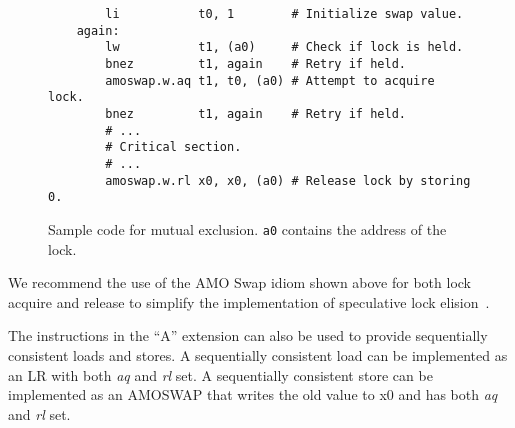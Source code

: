 \begin{figure}[h!]
\begin{center}
\begin{verbatim}
        li           t0, 1        # Initialize swap value.
    again:
        lw           t1, (a0)     # Check if lock is held.
        bnez         t1, again    # Retry if held.
        amoswap.w.aq t1, t0, (a0) # Attempt to acquire lock.
        bnez         t1, again    # Retry if held.
        # ...
        # Critical section.
        # ...
        amoswap.w.rl x0, x0, (a0) # Release lock by storing 0.
\end{verbatim}
\end{center}
\caption{Sample code for mutual exclusion.  {\tt a0} contains the address of the lock.}
\label{critical}
\end{figure}

\begin{commentary}
We recommend the use of the AMO Swap idiom shown above for both lock
acquire and release to simplify the implementation of speculative lock
elision~\cite{Rajwar:2001:SLE}.
\end{commentary}

The instructions in the ``A'' extension can also be used to provide
sequentially consistent loads and stores.  A sequentially consistent load can
be implemented as an LR with both {\em aq} and {\em rl} set. A sequentially
consistent store can be implemented as an AMOSWAP that writes the old value to
x0 and has both {\em aq} and {\em rl} set.
